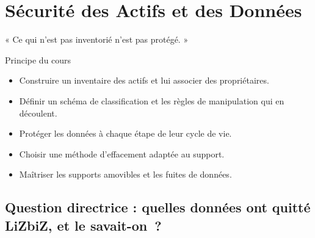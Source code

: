 
\chapter{Sécurité des Actifs et des Données}
\label{chap:actifs}

\epigraph{%
    « Ce qui n'est pas inventorié n'est pas protégé. »%
}{Principe du cours}


\begin{boxobjectifs}
\begin{itemize}
    \item Construire un inventaire des actifs et lui associer des
          propriétaires.
    \item Définir un schéma de classification et les règles de
          manipulation qui en découlent.
    \item Protéger les données à chaque étape de leur cycle de vie.
    \item Choisir une méthode d'effacement adaptée au support.
    \item Maîtriser les supports amovibles et les fuites de données.
\end{itemize}
\end{boxobjectifs}

\bigskip

\section*{Question directrice : quelles données ont quitté LiZbiZ, et le savait-on~?}

